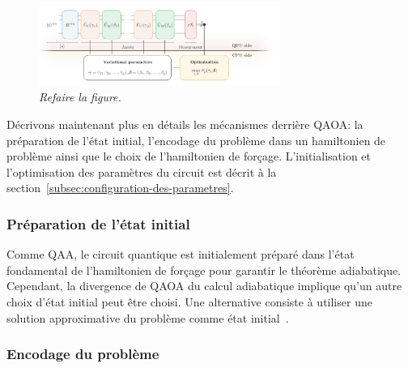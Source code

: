 \begin{figure}[ht!]
    \centering
    \includegraphics[width=0.7\textwidth]{figures/qaoa.png}
    \caption[Algorithme quantique d'optimisation approximative]{\textcolor{mydarkred}{\textit{Refaire la figure.}}}
    \label{fig:qaoa}
\end{figure}

Décrivons maintenant plus en détails les mécanismes derrière QAOA: la préparation de l'état initial, l'encodage du problème dans un hamiltonien de problème ainsi que le choix de l'hamiltonien de forçage. L'initialisation et l'optimisation des paramètres du circuit est décrit à la section~\ref{subsec:configuration-des-parametres}.


\subsubsection{Préparation de l'état initial}
\label{subsec:preparation-de-etat-initial}

Comme QAA, le circuit quantique est initialement préparé dans l'état fondamental de l'hamiltonien de forçage pour garantir le théorème adiabatique. Cependant, la divergence de QAOA du calcul adiabatique implique qu'un autre choix d'état initial peut être choisi. Une alternative consiste à utiliser une solution approximative du problème comme état initial~\cite{eggerWarmstartingQuantumOptimization2021}. 


\subsubsection{Encodage du problème}
\label{subsec:encodage-probleme}

